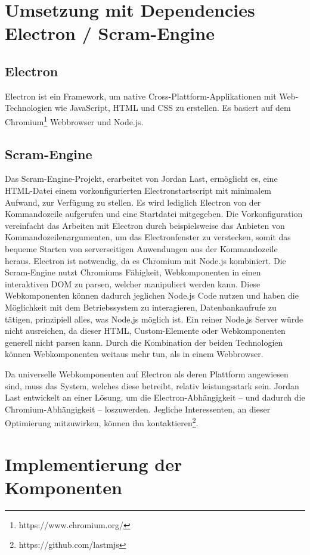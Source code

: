 \section{Umsetzung mit Dependencies Electron / Scram-Engine}
\subsection{Electron}
Electron ist ein Framework, um native Cross-Plattform-Applikationen mit Web-Technologien wie JavaScript, HTML und CSS zu erstellen. Es basiert auf dem Chromium\footnote{https://www.chromium.org/} Webbrowser und Node.js.
\subsection{Scram-Engine}
\label{cha:scram-engine}
Das Scram-Engine-Projekt, erarbeitet von Jordan Last, ermöglicht es, eine HTML-Datei einem vorkonfigurierten Electronstartscript mit minimalem Aufwand, zur Verfügung zu stellen. Es wird lediglich Electron von der Kommandozeile aufgerufen und eine Startdatei mitgegeben. Die Vorkonfiguration vereinfacht das Arbeiten mit Electron durch beispielsweise das Anbieten von Kommandozeilenargumenten, um das Electronfenster zu verstecken, somit das bequeme Starten von serverseitigen Anwendungen aus der Kommandozeile heraus.
Electron ist notwendig, da es Chromium mit Node.js kombiniert. Die Scram-Engine nutzt Chromiums Fähigkeit, Webkomponenten in einen interaktiven DOM zu parsen, welcher manipuliert werden kann. Diese Webkomponenten können dadurch jeglichen Node.js Code nutzen und haben die Möglichkeit mit dem Betriebssystem zu interagieren, Datenbankaufrufe zu tätigen, prinzipiell alles, was Node.js möglich ist.
Ein reiner Node.js Server würde nicht ausreichen, da dieser HTML, Custom-Elemente oder Webkomponenten generell nicht parsen kann.
Durch die Kombination der beiden Technologien können Webkomponenten weitaus mehr tun, als in einem Webbrowser.

Da universelle Webkomponenten auf Electron als deren Plattform angewiesen sind, muss das System, welches diese betreibt, relativ leistungsstark sein. Jordan Last entwickelt an einer Lösung, um die Electron-Abhängigkeit -- und dadurch die Chromium-Abhängigkeit -- loszuwerden. Jegliche Interessenten, an dieser Optimierung mitzuwirken, können ihn kontaktieren\footnote{https://github.com/lastmjs}.

\section{Implementierung der Komponenten}
